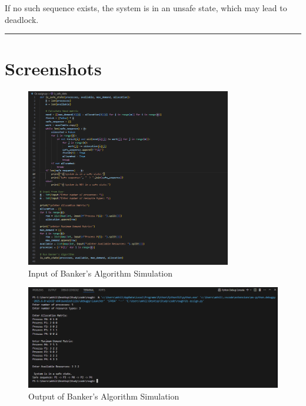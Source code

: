 \documentclass{article}
\begin{document}
\noindent If no such sequence exists, the system is in an unsafe state, which may lead to deadlock.

\vspace{15pt}
\noindent\rule{\textwidth}{0.4pt}

\newpage

\section*{Screenshots}

\begin{figure}[h!]
    \centering
    \includegraphics[width=0.8\textwidth]{1.png}
    \caption{Input of Banker's Algorithm Simulation}
    \label{fig:bankeroutput}
\end{figure}

\begin{figure}[h!]
    \centering
    \includegraphics[width=1\textwidth]{2.png}
    \caption{Output of Banker's Algorithm Simulation}
    \label{fig:bankeroutput}
\end{figure}
\end{document}
